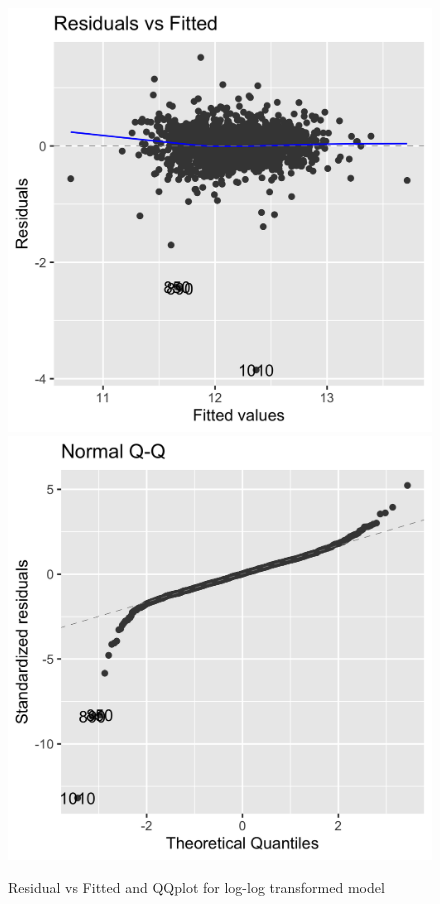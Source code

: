 \documentclass[letterpaper,8pt,twocolumn,twoside,]{pinp}
\begin{document}
\begin{figure}[h]

{\centering \includegraphics[width=0.49\linewidth]{plot3} \includegraphics[width=0.49\linewidth]{plot4} 

}

\caption{Residual vs Fitted and QQplot for log-log transformed model}\label{fig:log-log assumption}
\end{figure}
\end{document}
